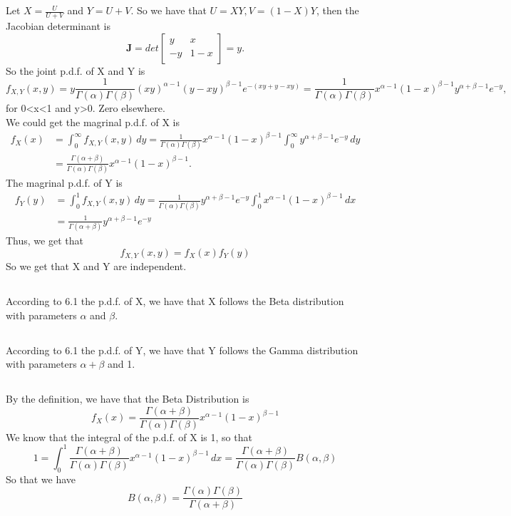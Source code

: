 \documentclass[10.5pt]{article}
\begin{document}
\subsection{}
Let $X=\frac{U}{U+V}$ and $Y=U+V$. So we have that $U=XY,V=(1-X)Y$, then the Jacobian determinant is $$\mathbf{J}=det\begin{bmatrix}
    y & x\\
    -y & 1-x
\end{bmatrix}=y.$$\indent
So the joint p.d.f. of X and Y is $$f_{X,Y}(x,y)=y\frac{1}{\Gamma(\alpha)\Gamma(\beta)}(xy)^{\alpha-1}(y-xy)^{\beta-1}e^{-(xy+y-xy)}=\frac{1}{\Gamma(\alpha)\Gamma(\beta)}x^{\alpha-1}(1-x)^{\beta-1}y^{\alpha+\beta-1}e^{-y},$$\indent
for 0<x<1 and y>0. Zero elsewhere.\\\indent
We could get the magrinal p.d.f. of X is $$\begin{aligned}
    f_X(x)&=\int_0^{\infty}f_{X,Y}(x,y)\,dy=\frac{1}{\Gamma(\alpha)\Gamma(\beta)}x^{\alpha-1}(1-x)^{\beta-1}\int_0^{\infty}y^{\alpha+\beta-1}e^{-y}\,dy\\
    &=\frac{\Gamma(\alpha+\beta)}{\Gamma(\alpha)\Gamma(\beta)}x^{\alpha-1}(1-x)^{\beta-1}.
\end{aligned}$$\indent
The magrinal p.d.f. of Y is $$\begin{aligned}
    f_Y(y)&=\int_0^1f_{X,Y}(x,y)\,dy=\frac{1}{\Gamma(\alpha)\Gamma(\beta)}y^{\alpha+\beta-1}e^{-y}\int_0^1x^{\alpha-1}(1-x)^{\beta-1}\,dx\\
    &=\frac{1}{\Gamma(\alpha+\beta)}y^{\alpha+\beta-1}e^{-y}
\end{aligned}$$\indent
Thus, we get that $$f_{X,Y}(x,y)=f_X(x)f_Y(y)$$\indent
So we get that X and Y are independent.
\subsection{}
According to 6.1 the p.d.f. of X, we have that X follows the Beta distribution with parameters $\alpha$ and $\beta$.
\subsection{}
According to 6.1 the p.d.f. of Y, we have that Y follows the Gamma distribution with parameters $\alpha+\beta$ and 1.
\subsection{}
By the definition, we have that the Beta Distribution is $$f_X(x)=\frac{\Gamma(\alpha+\beta)}{\Gamma(\alpha)\Gamma(\beta)}x^{\alpha-1}(1-x)^{\beta-1}$$\indent
We know that the integral of the p.d.f. of X is 1, so that $$1=\int_0^1\frac{\Gamma(\alpha+\beta)}{\Gamma(\alpha)\Gamma(\beta)}x^{\alpha-1}(1-x)^{\beta-1}\,dx=\frac{\Gamma(\alpha+\beta)}{\Gamma(\alpha)\Gamma(\beta)}B(\alpha,\beta)$$\indent
So that we have $$B(\alpha,\beta)=\frac{\Gamma(\alpha)\Gamma(\beta)}{\Gamma(\alpha+\beta)}$$
\end{document}
